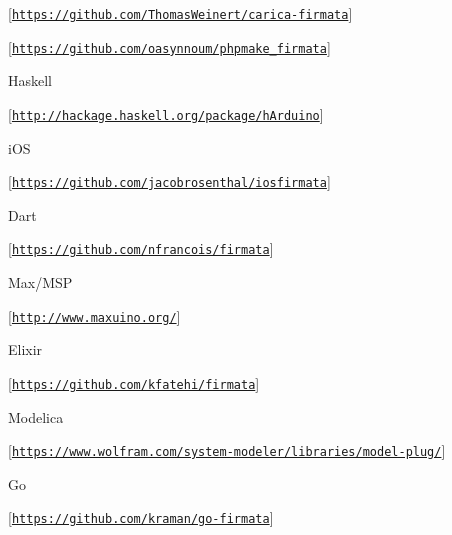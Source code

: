 \begin{DoxyItemize}
\begin{DoxyItemize}
\item \mbox{[}\href{https://github.com/ThomasWeinert/carica-firmata}{\tt https\+://github.\+com/\+Thomas\+Weinert/carica-\/firmata}\mbox{]}
\item \mbox{[}\href{https://github.com/oasynnoum/phpmake_firmata}{\tt https\+://github.\+com/oasynnoum/phpmake\+\_\+firmata}\mbox{]}
\end{DoxyItemize}
\item Haskell
\begin{DoxyItemize}
\item \mbox{[}\href{http://hackage.haskell.org/package/hArduino}{\tt http\+://hackage.\+haskell.\+org/package/h\+Arduino}\mbox{]}
\end{DoxyItemize}
\item i\+OS
\begin{DoxyItemize}
\item \mbox{[}\href{https://github.com/jacobrosenthal/iosfirmata}{\tt https\+://github.\+com/jacobrosenthal/iosfirmata}\mbox{]}
\end{DoxyItemize}
\item Dart
\begin{DoxyItemize}
\item \mbox{[}\href{https://github.com/nfrancois/firmata}{\tt https\+://github.\+com/nfrancois/firmata}\mbox{]}
\end{DoxyItemize}
\item Max/\+M\+SP
\begin{DoxyItemize}
\item \mbox{[}\href{http://www.maxuino.org/}{\tt http\+://www.\+maxuino.\+org/}\mbox{]}
\end{DoxyItemize}
\item Elixir
\begin{DoxyItemize}
\item \mbox{[}\href{https://github.com/kfatehi/firmata}{\tt https\+://github.\+com/kfatehi/firmata}\mbox{]}
\end{DoxyItemize}
\item Modelica
\begin{DoxyItemize}
\item \mbox{[}\href{https://www.wolfram.com/system-modeler/libraries/model-plug/}{\tt https\+://www.\+wolfram.\+com/system-\/modeler/libraries/model-\/plug/}\mbox{]}
\end{DoxyItemize}
\item Go
\begin{DoxyItemize}
\item \mbox{[}\href{https://github.com/kraman/go-firmata}{\tt https\+://github.\+com/kraman/go-\/firmata}\mbox{]}

\end{DoxyItemize}
\end{DoxyItemize}
